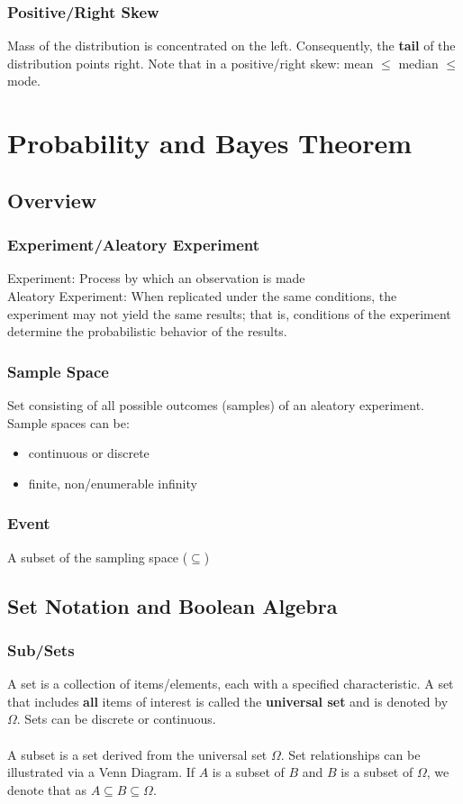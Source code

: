 \documentclass[13pt]{article}
\begin{document}
\subsubsection{Positive/Right Skew}
Mass of the distribution is concentrated on the left. Consequently,
the \textbf{tail} of the distribution points right. Note that in a positive/right
skew: mean $\leq$ median $\leq$ mode.





\section{Probability and Bayes Theorem}
\subsection{Overview}
\subsubsection{Experiment/Aleatory Experiment}
Experiment: Process by which an observation is made \\
Aleatory Experiment: When replicated under the same conditions, the
experiment may not yield the same results; that is, conditions of the
experiment determine the probabilistic behavior of the results.

\subsubsection{Sample Space} Set consisting of all possible outcomes
(samples) of an aleatory experiment. Sample spaces can be:
\begin{itemize}[label=-]
\item continuous or discrete
\item finite, non/enumerable infinity
\end{itemize}

\subsubsection{Event} A subset of the sampling space ($\subseteq$)

\subsection{Set Notation and Boolean Algebra}
\subsubsection{Sub/Sets} A set is a collection of items/elements, each
with a specified characteristic. A set that includes \textbf{all}
items of interest is called the \textbf{universal set} and is denoted
by $\Omega$. Sets can be discrete or continuous. \\ \\
A subset is a set derived from the universal set $\Omega$. Set
relationships can be illustrated via a Venn Diagram. If $A$ is a
subset of $B$ and $B$ is a subset of $\Omega$, we denote that as $A
\subseteq B \subseteq \Omega$.
\end{document}
